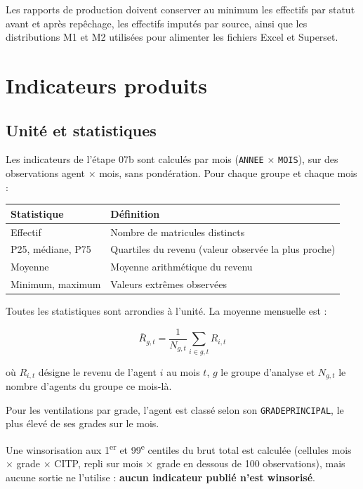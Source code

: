 \documentclass[12pt,a4paper,french]{article}
\renewcommand{\_}{\underscoreorigine\allowbreak}
\begin{document}
Les rapports de production doivent conserver au minimum les effectifs par statut avant et après repêchage, les effectifs imputés par source, ainsi que les distributions M1 et M2 utilisées pour alimenter les fichiers Excel et Superset.

\section{Indicateurs produits}

\subsection{Unité et statistiques}

Les indicateurs de l'étape 07b sont calculés par mois (\texttt{ANNEE} $\times$ \texttt{MOIS}), sur des observations agent $\times$ mois, sans pondération. Pour chaque groupe et chaque mois :

\begin{center}
\begin{tabular}{ll}
    \toprule
    \textbf{Statistique} & \textbf{Définition} \\
    \midrule
    Effectif & Nombre de matricules distincts \\
    P25, médiane, P75 & Quartiles du revenu (valeur observée la plus proche) \\
    Moyenne & Moyenne arithmétique du revenu \\
    Minimum, maximum & Valeurs extrêmes observées \\
    \bottomrule
\end{tabular}
\end{center}

Toutes les statistiques sont arrondies à l'unité. La moyenne mensuelle est :

\[
\overline{R}_{g,t} = \frac{1}{N_{g,t}} \sum_{i \in g,t} R_{i,t}
\]

où $R_{i,t}$ désigne le revenu de l'agent $i$ au mois $t$, $g$ le groupe d'analyse et $N_{g,t}$ le nombre d'agents du groupe ce mois-là.

Pour les ventilations par grade, l'agent est classé selon son \texttt{GRADE\_PRINCIPAL}, le plus élevé de ses grades sur le mois.

Une winsorisation aux 1\textsuperscript{er} et 99\textsuperscript{e} centiles du brut total est calculée (cellules mois $\times$ grade $\times$ CITP, repli sur mois $\times$ grade en dessous de 100 observations), mais aucune sortie ne l'utilise : \textbf{aucun indicateur publié n'est winsorisé}.
\end{document}
